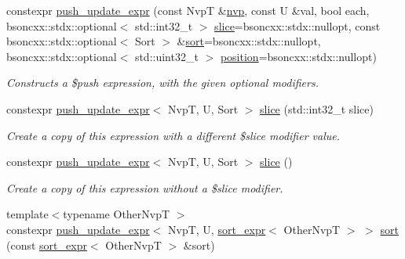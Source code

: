 \begin{DoxyCompactItemize}
\item 
constexpr \hyperlink{classmongo__odm_1_1push__update__expr_a8268dfd7d8a1e682ae950d7399d26f54}{push\+\_\+update\+\_\+expr} (const NvpT \&\hyperlink{classmongo__odm_1_1nvp}{nvp}, const U \&val, bool each, bsoncxx\+::stdx\+::optional$<$ std\+::int32\+\_\+t $>$ \hyperlink{classmongo__odm_1_1push__update__expr_a55d76eef6ebc8a1ba154a6e3a4245932}{slice}=bsoncxx\+::stdx\+::nullopt, const bsoncxx\+::stdx\+::optional$<$ Sort $>$ \&\hyperlink{classmongo__odm_1_1push__update__expr_a563708e3931d6f428e0ec6f9efa58b54}{sort}=bsoncxx\+::stdx\+::nullopt, bsoncxx\+::stdx\+::optional$<$ std\+::uint32\+\_\+t $>$ \hyperlink{classmongo__odm_1_1push__update__expr_adb225c5e9549be9c7d790aff4bdcf856}{position}=bsoncxx\+::stdx\+::nullopt)
\begin{DoxyCompactList}\small\item\em Constructs a \$push expression, with the given optional modifiers. \end{DoxyCompactList}\item 
constexpr \hyperlink{classmongo__odm_1_1push__update__expr}{push\+\_\+update\+\_\+expr}$<$ NvpT, U, Sort $>$ \hyperlink{classmongo__odm_1_1push__update__expr_a55d76eef6ebc8a1ba154a6e3a4245932}{slice} (std\+::int32\+\_\+t slice)
\begin{DoxyCompactList}\small\item\em Create a copy of this expression with a different \$slice modifier value. \end{DoxyCompactList}\item 
constexpr \hyperlink{classmongo__odm_1_1push__update__expr}{push\+\_\+update\+\_\+expr}$<$ NvpT, U, Sort $>$ \hyperlink{classmongo__odm_1_1push__update__expr_a3ca32e674928879d958c81f162f43c73}{slice} ()
\begin{DoxyCompactList}\small\item\em Create a copy of this expression without a \$slice modifier. \end{DoxyCompactList}\item 
{\footnotesize template$<$typename Other\+NvpT $>$ }\\constexpr \hyperlink{classmongo__odm_1_1push__update__expr}{push\+\_\+update\+\_\+expr}$<$ NvpT, U, \hyperlink{classmongo__odm_1_1sort__expr}{sort\+\_\+expr}$<$ Other\+NvpT $>$ $>$ \hyperlink{classmongo__odm_1_1push__update__expr_a563708e3931d6f428e0ec6f9efa58b54}{sort} (const \hyperlink{classmongo__odm_1_1sort__expr}{sort\+\_\+expr}$<$ Other\+NvpT $>$ \&sort)

\end{DoxyCompactItemize}
